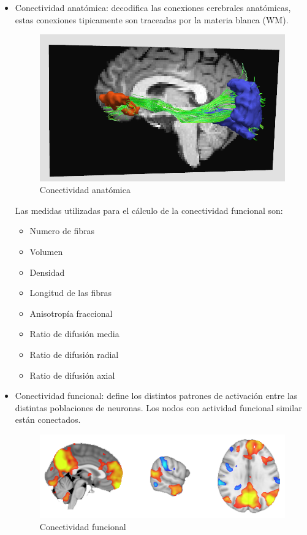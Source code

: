 \begin{itemize}
	\item Conectividad anatómica: decodifica las conexiones cerebrales anatómicas, estas conexiones tipicamente son traceadas por la materia blanca (WM).
	\begin{figure}[H]
  		\centering
    	\includegraphics[scale=0.5]{img/anat_conect.png}
  		\caption{Conectividad anatómica}         \label{preproc:anat_conect}
	\end{figure}
	Las medidas utilizadas para el cálculo de la conectividad funcional son:
	\begin{itemize}
		\item Numero de fibras
		\item Volumen
		\item Densidad
		\item Longitud de las fibras
		\item Anisotropía fraccional
		\item Ratio de difusión media
		\item Ratio de difusión radial
		\item Ratio de difusión axial
	\end{itemize}
	
	\item Conectividad funcional: define los distintos patrones de activación entre las distintas poblaciones de neuronas. Los nodos con actividad funcional similar están conectados.
	
	\begin{figure}[H]
  		\centering
    	\includegraphics[scale=0.5]{img/func_conect.png}
  		\caption{Conectividad funcional}         \label{preproc:func_conect}
	\end{figure}
	

\end{itemize}
